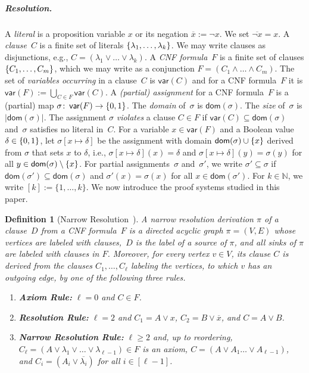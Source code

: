 \documentclass[10pt,a4paper]{article}
\newcommand{\defining}[1]{\emph{#1}}
\DeclarePairedDelimiter\set{\lbrace}{\rbrace}
\newcommand{\Vars}[1]{\mathsf{var}(#1)}
\newcommand{\nat}{\mathbb{N}}
\newcommand{\dom}{\mathsf{dom}}
\newtheorem{definition}[theorem]{Definition}
\begin{document}
\subparagraph{Resolution.}
A \defining{literal} is a proposition variable $x$ or its negation $\overline{x} := \neg x$. We set $\overline{\neg x} = x$.
A \defining{clause}~$C$ is a finite set of literals $\set{\lambda_1,\dots, \lambda_k}$.
We may write clauses as disjunctions, e.g., $C = (\lambda_1 \lor \dots \lor \lambda_k)$. %
A \defining{CNF formula}~$F$  is a finite set of clauses $\set{C_1,\dots,C_m}$,
which we may write as a conjunction $F = (C_1 \land \dots \land C_m)$.
The set of \defining{variables occurring} in a clause~$C$ is $\Vars{C}$
and for a CNF formula~$F$ it is $\Vars{F} := \bigcup_{C \in F} \Vars{C}$.
%
A \defining{(partial) assignment} for a CNF formula~$F$ is a (partial) map
$\sigma\colon \,\Vars{F} \to \set{0,1}$.
The \defining{domain} of~$\sigma$ is $\dom(\sigma)$.
The \defining{size} of~$\sigma$ is $|\dom(\sigma)|$.
The assignment $\sigma$ \defining{violates} a clause $C \in F$
if $\Vars{C} \subseteq \dom(\sigma)$ and~$\sigma$ satisfies no literal in~$C$.
For a variable $x \in \Vars{F}$ and a Boolean value $\delta \in \set{0,1}$,
let $\sigma[x\mapsto \delta]$ be the assignment with domain $\dom(\sigma) \cup \set{x}$ derived from $\sigma$ that sets $x$ to $\delta$, i.e., $\sigma[x\mapsto \delta](x) = \delta$ and $\sigma[x\mapsto \delta](y) = \sigma(y)$ for
all $y \in \dom(\sigma) \setminus \set{x}$.
For partial assignments~$\sigma$ and~$\sigma'$, we write $\sigma' \subseteq \sigma$ if $\dom(\sigma') \subseteq \dom(\sigma)$ and $\sigma'(x) = \sigma(x)$ for all $x\in \dom(\sigma')$. 
For $k\in \nat$, we write $[k]:= \{1, \dots, k\}$.
We now  introduce the proof systems studied in this paper. 


\begin{definition}[Narrow Resolution~\cite{DBLP:conf/sat/GalesiT05}]
A \defining{narrow resolution derivation} $\pi$ of a clause~$D$ from a CNF formula~$F$ is a directed acyclic graph $\pi=(V,E)$
whose vertices are labeled with clauses,~$D$ is the label of a source of $\pi$, and all sinks of $\pi$ are labeled with clauses in $F$.
Moreover, for every vertex $v \in V$, its clause $C$ is derived from the clauses $C_1,\dots, C_\ell$ labeling the vertices, to which $v$ has an outgoing edge, by one of the following three rules.
\begin{enumerate}
\item {\bf Axiom Rule:} \label{itm:axiom} $\ell = 0$ and $C \in F$.
\item {\bf Resolution Rule:} \label{itm:resolution} $\ell=2$ and $C_1 = A \vee x$, $C_2 = B \vee \overline{x}$, and $C = A \vee B$.
\item {\bf Narrow Resolution Rule:} \label{itm:narrow-resolution} 
$\ell\geq 2$ and, up to reordering, $C_\ell =(A \vee \lambda_1 \vee \dots \vee \lambda_{\ell-1}) 
\in F$ is an axiom, $C = (A \vee A_1 \dots \vee A_{\ell-1})$, and
$C_{i} = (A_i \vee 
\overline{\lambda_i})$ for all $i \in [\ell-1]$.
\end{enumerate}
\end{definition}
\end{document}
